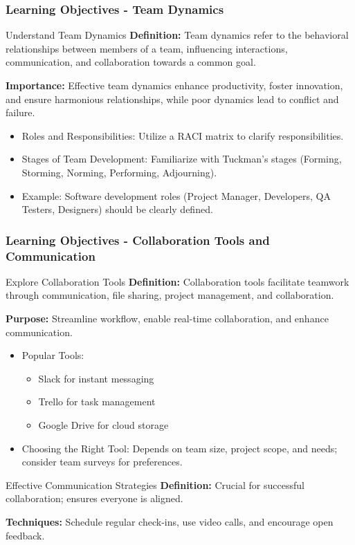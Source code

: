 \documentclass[aspectratio=169]{beamer}
\begin{document}
\begin{frame}[fragile]
    \frametitle{Learning Objectives - Team Dynamics}
    \begin{block}{Understand Team Dynamics}
        \textbf{Definition:} Team dynamics refer to the behavioral relationships between members of a team, influencing interactions, communication, and collaboration towards a common goal.
        
        \textbf{Importance:} Effective team dynamics enhance productivity, foster innovation, and ensure harmonious relationships, while poor dynamics lead to conflict and failure.
    \end{block}
    
    \begin{itemize}
        \item Roles and Responsibilities: Utilize a RACI matrix to clarify responsibilities.
        \item Stages of Team Development: Familiarize with Tuckman's stages (Forming, Storming, Norming, Performing, Adjourning).
        \item Example: Software development roles (Project Manager, Developers, QA Testers, Designers) should be clearly defined.
    \end{itemize}
\end{frame}

\begin{frame}[fragile]
    \frametitle{Learning Objectives - Collaboration Tools and Communication}
    \begin{block}{Explore Collaboration Tools}
        \textbf{Definition:} Collaboration tools facilitate teamwork through communication, file sharing, project management, and collaboration.
        
        \textbf{Purpose:} Streamline workflow, enable real-time collaboration, and enhance communication.
    \end{block}

    \begin{itemize}
        \item Popular Tools: 
        \begin{itemize}
            \item Slack for instant messaging
            \item Trello for task management
            \item Google Drive for cloud storage
        \end{itemize}
        \item Choosing the Right Tool: Depends on team size, project scope, and needs; consider team surveys for preferences.
    \end{itemize}

    \begin{block}{Effective Communication Strategies}
        \textbf{Definition:} Crucial for successful collaboration; ensures everyone is aligned.
        
        \textbf{Techniques:} Schedule regular check-ins, use video calls, and encourage open feedback.
    \end{block}
\end{frame}
\end{document}
